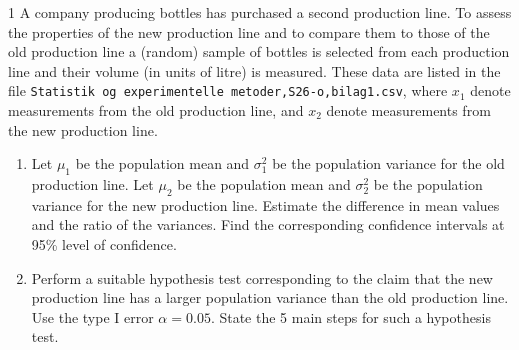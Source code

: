 \newcommand{\NoteType}{Take-home exam}
\newcommand{\CourseName}{Statistics \& Experimental Methods}
\newcommand{\CourseNumber}{290211U006}
\newcommand{\TheDate}{May 14, 2026}


    
    \newpage
    \begin{problem}{1}
      A company producing bottles has purchased a second production line.
      To assess the properties of the new production line and to compare them to those of the old production line a (random) sample of bottles is selected from each production line and their volume (in units of litre) is measured.
      These data are listed in the file \verb#Statistik og experimentelle metoder,S26-o,bilag1.csv#, where $x_1$ denote measurements from the old production line, and $x_2$ denote measurements from the new production line.

      \begin{enumerate}[label=\alph*)]
        \item Let $\mu_1$ be the population mean and $\sigma_1^2$ be the population variance for the old production line.
          Let $\mu_2$ be the population mean and $\sigma_2^2$ be the population variance for the new production line.
          Estimate the difference in mean values and the ratio of the variances.
          Find the corresponding confidence intervals at 95\% level of confidence.
        \item Perform a suitable hypothesis test corresponding to the claim that the new production line has a larger population variance than the old production line.
          Use the type I error $\alpha = \num{0,05}$.
          State the 5 main steps for such a hypothesis test.
      \end{enumerate}
    \end{problem}

